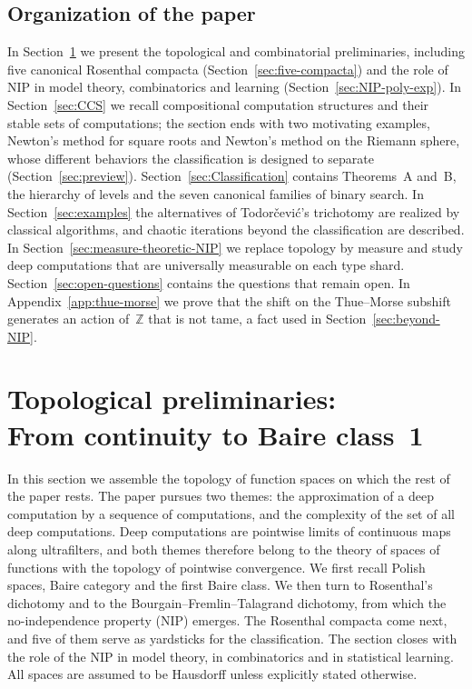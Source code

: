 \documentclass[psamsfonts]{amsart}
\theoremstyle{definition}
\theoremstyle{remark}
\newcommand{\NIP}{\text{NIP}}
\numberwithin{equation}{section}
\begin{document}
\subsection*{Organization of the paper}
In Section~\ref{sec:prelim} we present the topological and combinatorial preliminaries,
including five canonical Rosenthal compacta (Section~\ref{sec:five-compacta})
and the role of $\NIP$ in model theory, combinatorics and learning (Section~\ref{sec:NIP-poly-exp}).
In Section~\ref{sec:CCS} we recall compositional computation structures and their stable sets of computations; the section ends with two motivating examples, Newton's method for square roots and Newton's method on the Riemann sphere, whose different behaviors the classification is designed to separate (Section~\ref{sec:preview}).
Section~\ref{sec:Classification} contains Theorems~A and~B, the hierarchy of levels and the seven canonical families of binary search.
In Section~\ref{sec:examples} the alternatives of Todor\v{c}evi\'c's trichotomy are realized by classical algorithms, and chaotic iterations beyond the classification are described.
In Section~\ref{sec:measure-theoretic-NIP} we replace topology by measure and study deep computations that are universally measurable on each type shard.
Section~\ref{sec:open-questions} contains the questions that remain open.
In Appendix~\ref{app:thue-morse} we prove that the shift on the Thue--Morse subshift generates an action of~$\mathbb{Z}$ that is not tame, a fact used in Section~\ref{sec:beyond-NIP}.

\tableofcontents

\section{Topological preliminaries:\\
  From continuity to Baire class~1}
\label{sec:prelim}

In this section we assemble the topology of function spaces on which the rest of the paper rests.
The paper pursues two themes: the approximation of a deep computation by a sequence of computations, and the complexity of the set of all deep computations.
Deep computations are pointwise limits of continuous maps along ultrafilters, and both themes therefore belong to the theory of spaces of functions with the topology of pointwise convergence.
We first recall Polish spaces, Baire category and the first Baire class.
We then turn to Rosenthal's dichotomy and to the Bourgain--Fremlin--Talagrand dichotomy, from which the no-independence property (NIP) emerges.
The Rosenthal compacta come next, and five of them serve as yardsticks for the classification.
The section closes with the role of the NIP in model theory, in combinatorics and in statistical learning.
All spaces are assumed to be Hausdorff unless explicitly stated otherwise.
\end{document}
